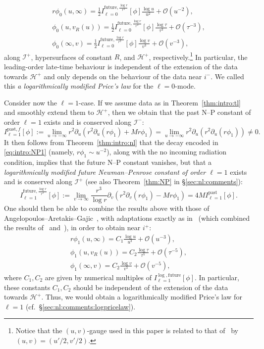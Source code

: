\documentclass[11pt,english]{article}
\numberwithin{equation}{section}
\theoremstyle{remark}
\theoremstyle{plain}
\theoremstyle{remark}
\newcommand{\pu}{\partial_u}
\newcommand{\pv}{\partial_v}
\renewcommand{\(}{\left(}
\renewcommand{\)}{\right)}
\newcommand{\ILlog}[1]{I_{\ell=#1}^{\mathrm{future},\frac{\log r}{r^3}}}
\newcommand{\ILp}[1]{I_{\ell=#1}^{\mathrm{past},f}}
\begin{document}
\begin{align}\label{eq:intro:asy1}
r\phi_0(u,\infty)=\frac12\ILlog0[\phi]\frac{\log u}{u^2}+\mathcal{O}(u^{-2}),\\
\phi_0(u,v_R(u))=\frac12\ILlog0[\phi]\frac{\log\tau}{\tau^3}+\mathcal{O}(\tau^{-3}),\\
\phi_0(\infty,v)=\frac12\ILlog0[\phi]\frac{\log v}{v^3}+\mathcal{O}(v^{-3}),\label{eq:intro:asy3}
\end{align}
along $\mathcal{I}^+$, hypersurfaces of constant $R$, and $\mathcal{H}^+$, respectively.\footnote{Notice that the $(u,v)$-gauge used in this paper is related to that of~\cite{II} by $(u,v)=(u'/2,v'/2)$. }  In particular, the leading-order late-time behaviour is independent of the extension of the data towards $\mathcal H^+$ and only depends on the behaviour of the data near $i^-$. We called this \textit{a logarithmically modified Price's law} for the $\ell=0$-mode.

Consider now the $\ell=1$-case. If we assume data as in Theorem~\ref{thm:intro:tl} and smoothly extend them  to $\mathcal H^+$, then we obtain that the past N--P constant of order $\ell=1$ exists and is conserved along $\mathcal{I}^-$:
\begin{equation}\label{eq:intro:NP1}
\ILp1[\phi]:=\lim_{u\to-\infty}r^2\pu(r^2\pu(r\phi_1)+Mr\phi_1)=\lim_{u\to-\infty}r^2\pu(r^2\pu(r\phi_1))\neq 0.
\end{equation}
It then follows from Theorem~\ref{thm:intro:nl} that the decay encoded in \eqref{eq:intro:NP1} (namely, $r\phi_1\sim u^{-2}$), along with the no incoming radiation condition, implies that the future N--P constant vanishes, but that a \textit{logarithmically modified future Newman--Penrose constant of order $\ell=1$} exists and is conserved along $\mathcal{I}^+$ (see also Theorem~\ref{thm:NP} in \S\ref{sec:nl:comments}):
\begin{equation}\label{eq:intro:NP2}
I_{\ell=1}^{ \mathrm{future},\frac{\log r}{r^3}}[\phi]:=\lim_{v\to\infty} \frac{r^3}{\log r} \pv(r^2\pv(r\phi_1)-Mr\phi_1)=4MI_{\ell=1}^{\mathrm{past}}[\phi].
\end{equation}
One should then be able to combine the results above with those of Angelopoulos--Aretakis--Gajic~\cite{AAG21}, with adaptations exactly as in~\cite{II} (which combined the results of~\cite{I} and~\cite{AAG18a,AAG18b}), in order to obtain near $i^+$:
\begin{align}\label{eq:intro:asy4}
r\phi_1(u,\infty)=C_1\frac{\log u}{u^3}+\mathcal{O}(u^{-3}),\\
\phi_1(u,v_R(u))=C_2\frac{\log\tau}{\tau^5}+\mathcal{O}(\tau^{-5}),\\
\phi_1(\infty,v)=C_2\frac{\log v}{v^5}+\mathcal{O}(v^{-5}),\label{eq:intro:asy6}
\end{align}where $C_1, C_2$ are given by numerical multiples of $I_{\ell=1}^{\log, \mathrm{future}}[\phi]$. In particular, these constants $C_1,C_2$ should be independent of the extension of the data towards $\mathcal H^+$.  
Thus, we would obtain a logarithmically modified Price's law for $\ell=1$ (cf.\ \S\ref{sec:nl:comments:logpricelaw}).
\end{document}
